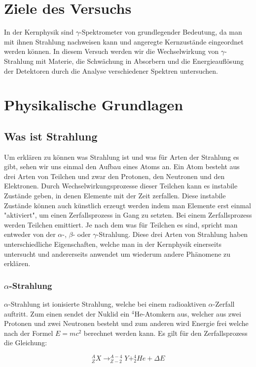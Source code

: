 \section{Ziele des Versuchs}

In der Kernphysik sind $\gamma$-Spektrometer von grundlegender Bedeutung, da man mit ihnen Strahlung nachweisen kann und angeregte Kernzustände eingeordnet werden können. In diesem Versuch werden wir die Wechselwirkung von $\gamma$-Strahlung mit Materie, die Schwächung in Absorbern und die Energieauflösung der Detektoren durch die Analyse verschiedener Spektren untersuchen.

\section{Physikalische Grundlagen}

\subsection{Was ist Strahlung}
Um erklären zu können was Strahlung ist und was für Arten der Strahlung es gibt, sehen wir uns einmal den Aufbau eines Atoms an. Ein Atom besteht aus drei Arten von Teilchen und zwar den Protonen, den Neutronen und den Elektronen. Durch Wechselwirkungsprozesse dieser Teilchen kann es instabile Zustände geben, in denen Elemente mit der Zeit zerfallen. Diese instabile Zustände können auch künstlich erzeugt werden indem man  Elemente erst einmal "aktiviert", um einen Zerfallsprozess in Gang zu setzten. Bei einem Zerfallsprozess werden Teilchen emittiert. Je nach dem was für Teilchen es sind, spricht man entweder von der $\alpha$-, $\beta$- oder $\gamma$-Strahlung. Diese drei Arten von Strahlung haben unterschiedliche Eigenschaften, welche man in der Kernphysik einerseits untersucht und andererseits anwendet um wiederum andere Phänomene zu erklären.

\subsubsection*{$\alpha$-Strahlung}
$\alpha$-Strahlung ist ionisierte Strahlung, welche bei einem radioaktiven $\alpha$-Zerfall auftritt. Zum einen sendet der Nuklid ein $^{4}$He-Atomkern aus, welcher aus zwei Protonen und zwei Neutronen besteht und zum anderen wird Energie frei welche nach der Formel $E=mc^{2}$ berechnet werden kann. Es gilt für den Zerfallsprozess die Gleichung:

\begin{equation}
^{A}_{Z}X \rightarrow ^{A-4}_{Z-2}Y + ^{4}_{2}He + \Delta E 
\end{equation}

